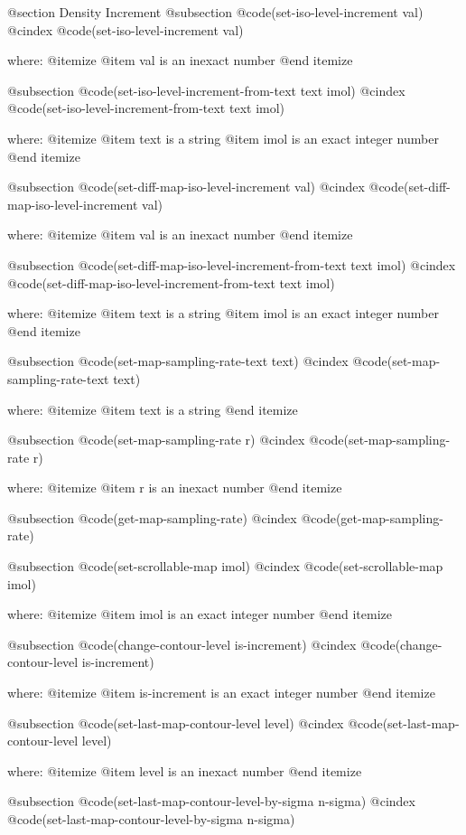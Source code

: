 @section Density Increment 
@subsection @code{(set-iso-level-increment val)}
@cindex @code{(set-iso-level-increment val)}
 
where: 
 @itemize 
     @item val is an inexact number
 @end itemize


@subsection @code{(set-iso-level-increment-from-text text imol)}
@cindex @code{(set-iso-level-increment-from-text text imol)}
 
where: 
 @itemize 
     @item text is a string
     @item imol is an exact integer number
 @end itemize


@subsection @code{(set-diff-map-iso-level-increment val)}
@cindex @code{(set-diff-map-iso-level-increment val)}
 
where: 
 @itemize 
     @item val is an inexact number
 @end itemize


@subsection @code{(set-diff-map-iso-level-increment-from-text text imol)}
@cindex @code{(set-diff-map-iso-level-increment-from-text text imol)}
 
where: 
 @itemize 
     @item text is a string
     @item imol is an exact integer number
 @end itemize


@subsection @code{(set-map-sampling-rate-text text)}
@cindex @code{(set-map-sampling-rate-text text)}
 
where: 
 @itemize 
     @item text is a string
 @end itemize


@subsection @code{(set-map-sampling-rate r)}
@cindex @code{(set-map-sampling-rate r)}
 
where: 
 @itemize 
     @item r is an inexact number
 @end itemize


@subsection @code{(get-map-sampling-rate)}
@cindex @code{(get-map-sampling-rate)}
 
@subsection @code{(set-scrollable-map imol)}
@cindex @code{(set-scrollable-map imol)}
 
where: 
 @itemize 
     @item imol is an exact integer number
 @end itemize


@subsection @code{(change-contour-level is-increment)}
@cindex @code{(change-contour-level is-increment)}
 
where: 
 @itemize 
     @item is-increment is an exact integer number
 @end itemize


@subsection @code{(set-last-map-contour-level level)}
@cindex @code{(set-last-map-contour-level level)}
 
where: 
 @itemize 
     @item level is an inexact number
 @end itemize


@subsection @code{(set-last-map-contour-level-by-sigma n-sigma)}
@cindex @code{(set-last-map-contour-level-by-sigma n-sigma)}
 
